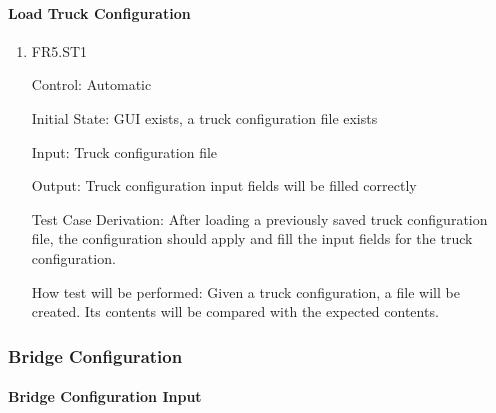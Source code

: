 \documentclass[12pt, titlepage]{article}
\begin{document}
\paragraph{Load Truck Configuration}

\begin{enumerate}

  \item{FR5.ST1\\}

  Control: Automatic

  Initial State: GUI exists, a truck configuration file exists

  Input: Truck configuration file

  Output: Truck configuration input fields will be filled correctly

  Test Case Derivation: After loading a previously saved truck configuration file, the configuration
  should apply and fill the input fields for the truck configuration.

  How test will be performed: Given a truck configuration, a file will be created. Its contents
  will be compared with the expected contents.

\end{enumerate}

\subsubsection{Bridge Configuration}

\paragraph{Bridge Configuration Input}
\end{document}
